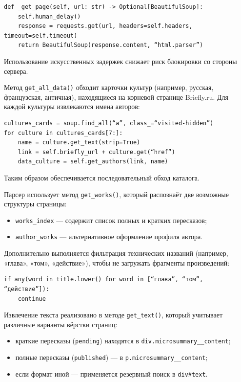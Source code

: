\documentclass[coursework]{SCWorks}
\begin{document}
    \begin{verbatim}
def _get_page(self, url: str) -> Optional[BeautifulSoup]:
    self.human_delay()
    response = requests.get(url, headers=self.headers, timeout=self.timeout)
    return BeautifulSoup(response.content, “html.parser”)
    \end{verbatim}

    Использование искусственных задержек снижает риск блокировки со стороны сервера.


    Метод \texttt{get\_all\_data()} обходит карточки культур (например, русская, французская, античная), находящиеся на корневой
    странице Briefly.ru.
    Для каждой культуры извлекаются имена авторов:

    \begin{verbatim}
cultures_cards = soup.find_all(“a”, class_=“visited-hidden”)
for culture in cultures_cards[7:]:
    name = culture.get_text(strip=True)
    link = self.briefly_url + culture.get(“href”)
    data_culture = self.get_authors(link, name)
    \end{verbatim}

    Таким образом обеспечивается последовательный обход каталога.

    Парсер использует метод \texttt{get\_works()}, который распознаёт две возможные структуры страницы:
    \begin{itemize}
        \item \texttt{works\_index} — содержит список полных и кратких пересказов;
        \item \texttt{author\_works} — альтернативное оформление профиля автора.
    \end{itemize}

    Дополнительно выполняется фильтрация технических названий (например, «глава», «том», «действие»),
    чтобы не загружать фрагменты произведений:

    \begin{verbatim}
if any(word in title.lower() for word in [“глава”, “том”, “действие”]):
    continue
    \end{verbatim}

    Извлечение текста реализовано в методе \texttt{get\_text()}, который учитывает различные варианты вёрстки страниц:

    \begin{itemize}
        \item краткие пересказы (\texttt{pending}) находятся в \texttt{div.microsummary\_\_content};
        \item полные пересказы (\texttt{published}) — в \texttt{p.microsummary\_\_content};
        \item если формат иной — применяется резервный поиск в \texttt{div#text}.
    \end{itemize}
\end{document}
